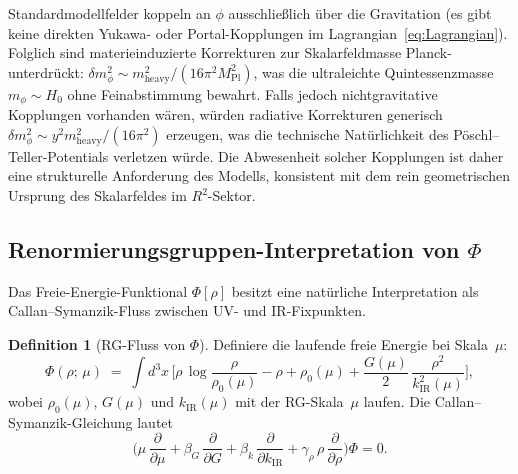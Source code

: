 \documentclass[12pt,a4paper]{article}
\theoremstyle{definition}
\newtheorem{definition}{Definition}[section]
\theoremstyle{plain}
\theoremstyle{remark}
\begin{document}
Standardmodellfelder koppeln an $\phi$ ausschlie\ss lich \"uber die
Gravitation (es gibt keine direkten Yukawa- oder Portal-Kopplungen
im Lagrangian~\eqref{eq:Lagrangian}). Folglich sind
materieinduzierte Korrekturen zur Skalarfeldmasse
Planck-unterdr\"uckt:
$\delta m_\phi^2 \sim m_{\mathrm{heavy}}^2/(16\pi^2 M_{\mathrm{Pl}}^2)$,
was die ultraleichte Quintessenzmasse $m_\phi \sim H_0$ ohne
Feinabstimmung bewahrt. Falls jedoch nichtgravitative Kopplungen
vorhanden w\"aren, w\"urden radiative Korrekturen generisch
$\delta m_\phi^2 \sim y^2 m_{\mathrm{heavy}}^2/(16\pi^2)$ erzeugen,
was die technische Nat\"urlichkeit des P\"oschl--Teller-Potentials
verletzen w\"urde. Die Abwesenheit solcher Kopplungen ist daher eine
strukturelle Anforderung des Modells, konsistent mit dem rein
geometrischen Ursprung des Skalarfeldes im $R^2$-Sektor.

\subsection{Renormierungsgruppen-Interpretation von $\Phi$}
\label{sec:rg-interpretation}

Das Freie-Energie-Funktional $\Phi[\rho]$ besitzt eine nat\"urliche
Interpretation als Callan--Symanzik-Fluss zwischen UV- und
IR-Fixpunkten.

\begin{definition}[RG-Fluss von $\Phi$]
\label{def:rg-flow-phi}
Definiere die laufende freie Energie bei Skala~$\mu$:
\[
  \Phi(\rho;\,\mu)
  \;=\;
  \int d^{3}x\,\biggl[
    \rho\,\log\frac{\rho}{\rho_{0}(\mu)}
    - \rho + \rho_{0}(\mu)
    + \frac{G(\mu)}{2}\,\frac{\rho^{2}}{k_{\mathrm{IR}}^{2}(\mu)}
  \biggr],
\]
wobei $\rho_{0}(\mu)$, $G(\mu)$ und $k_{\mathrm{IR}}(\mu)$ mit der
RG-Skala~$\mu$ laufen.  Die Callan--Symanzik-Gleichung lautet
\[
  \biggl(
    \mu\,\frac{\partial}{\partial\mu}
    + \beta_{G}\,\frac{\partial}{\partial G}
    + \beta_{k}\,\frac{\partial}{\partial k_{\mathrm{IR}}}
    + \gamma_{\rho}\,\rho\,\frac{\partial}{\partial\rho}
  \biggr)\Phi = 0.
\]
\end{definition}
\end{document}
